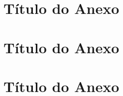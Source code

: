 \documentclass[
	12pt,				%
	openright,			%
	oneside,			%
	a4paper,			%
	english,			%
	french,				%
	spanish,			%
	brazil				%
	]{abntex2}
\begin{document}
\begin{anexosenv}

\partanexos

\chapter{Título do Anexo}
\lipsum[28]

\chapter{Título do Anexo}

\lipsum[29]

\chapter{Título do Anexo}

\lipsum[30]

\end{anexosenv}

\printindex
\end{document}
